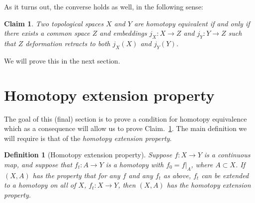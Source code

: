 \documentclass[10pt, oneside]{amsart}
\newtheorem{definition}{Definition}
\newtheorem{claim}{Claim}
\theoremstyle{definition}
\begin{document}
\begin{comment}
  Let $r_X$ be the retraction onto $X$ and let $r_Y$ be the retraction onto $Y$. Take $f = r_X \circ j_Y$ and $g = r_Y \circ j_X$. Note that since $Z$ deformation retracts to $X$ and $Y$,
  $j_X \circ r_X \simeq \text{id}$ and $j_Y \circ r_Y \simeq \text{id}$. Thus,
  \begin{equation}
    f \circ g = r_X \circ (j_Y \circ r_Y) \circ j_X \simeq r_X \circ j_X = \text{id}_X
  \end{equation}
  and
  \begin{equation}
    g \circ f = r_Y \circ (j_X \circ r_X) \circ j_Y \simeq r_Y \circ j_Y = \text{id}_Y
  \end{equation}
  so $f : Y \rightarrow X$ is a homotopy equivalence, and the proof is complete.
\end{comment}

\noindent As it turns out, the converse holds as well, in the following sense:

\begin{claim}
  \label{claim:1}
  Two topological spaces $X$ and $Y$ are homotopy equivalent if and only if there exists a common space $Z$ and embeddings $j_X : X \rightarrow Z$ and $j_Y : Y \rightarrow Z$
  such that $Z$ deformation retracts to both $j_X(X)$ and $j_Y(Y)$.
\end{claim}

\noindent We will prove this in the next section.

\section{Homotopy extension property}

\noindent The goal of this (final) section is to prove a condition for homotopy equivalence which as a consequence will
allow us to prove Claim.~\ref{claim:1}. The main definition we will require is that of the \emph{homotopy extension property}.

\begin{definition}[Homotopy extension property]
  Suppose $f : X \rightarrow Y$ is a continuous map, and suppose that $f_t : A \rightarrow Y$ is a homotopy with $f_0 = f|_A$,
  where $A \subset X$. If $(X, A)$ has the property that for any $f$ and any $f_t$ as above, $f_t$ can be extended to a homotopy
  on all of $X$, $f_t : X \rightarrow Y$, then $(X, A)$ has the homotopy extension property.
\end{definition}
\end{document}
